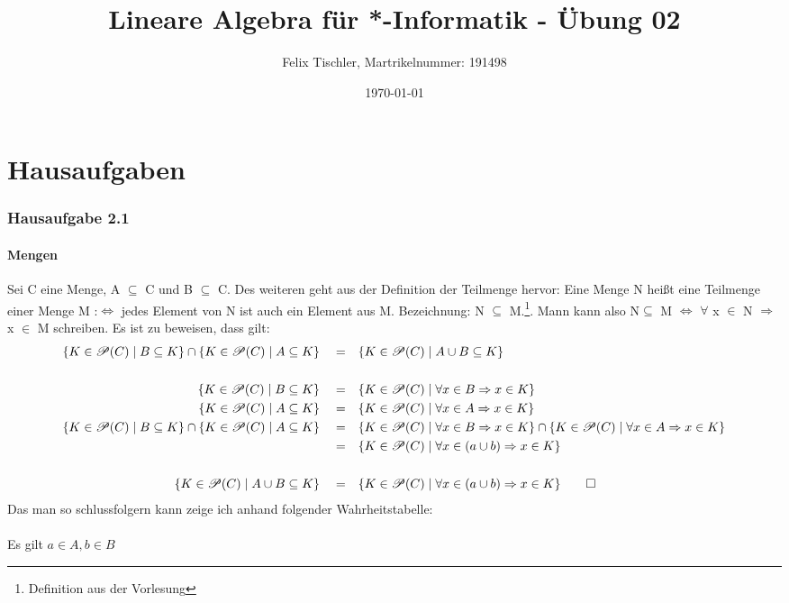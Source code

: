 \documentclass[titlepage]{article}
\begin{document}
	
	\title{Lineare Algebra für *-Informatik - Übung 02}
	\author{Felix Tischler, Martrikelnummer: 191498}
	\date{\today}
	\maketitle

	\part*{Hausaufgaben}
	\section*{Hausaufgabe 2.1} 
		\subsection*{Mengen}
			Sei C eine Menge, A $\subseteq$ C und B $\subseteq$ C. Des weiteren geht aus der Definition der Teilmenge hervor:
			Eine Menge N heißt eine Teilmenge einer Menge M :$\Leftrightarrow$ jedes Element von
			N ist auch ein Element aus M. Bezeichnung: N $\subseteq$ M.\footnote{Definition aus der Vorlesung}. Mann kann also N$\subseteq$ M $\Leftrightarrow$ $\forall$ x $\in$ N $\Rightarrow$ x $\in$ M schreiben. Es ist zu beweisen, dass gilt:
			\begin{align*}
				\{K \in \mathscr{P}(C) \mid B \subseteq K\}\cap \{K \in \mathscr{P}(C) \mid A \subseteq K\}&& &= &&\{K \in \mathscr{P}(C) \mid A\cup B \subseteq K\}\\\\
				 \{K \in \mathscr{P}(C) \mid B \subseteq K\}&& &= && \{K \in \mathscr{P}(C) \mid \forall x \in B \Rightarrow x \in K\}\\
				 \{K \in \mathscr{P}(C) \mid A \subseteq K\}&& &= && \{K \in \mathscr{P}(C) \mid \forall x \in A \Rightarrow x \in K\}\\
				 \{K \in \mathscr{P}(C) \mid B \subseteq K\}\cap \{K \in \mathscr{P}(C) \mid A \subseteq K\}&& &= &&\{K \in \mathscr{P}(C) \mid \forall x \in B \Rightarrow x \in K\} \cap \{K \in \mathscr{P}(C) \mid \forall x \in A \Rightarrow x \in K\}\\
				 && &= &&\{K \in \mathscr{P}(C) \mid \forall x \in (a\cup b) \Rightarrow x \in K\}\\
				 \\
				 \{K \in \mathscr{P}(C) \mid A\cup B \subseteq K\}&& &= && \{K \in \mathscr{P}(C) \mid \forall x \in (a \cup b) \Rightarrow x \in K\} \qed
			 \end{align*}
		 Das man so schlussfolgern kann zeige ich anhand folgender Wahrheitstabelle: \\\\
		 Es gilt $a\in A, b\in B$
\end{document}
